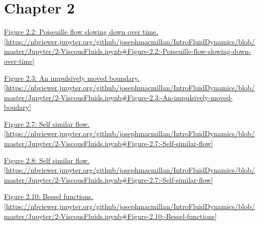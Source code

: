 \section{Chapter 2}

\noindent \href{https://nbviewer.jupyter.org/github/josephmacmillan/IntroFluidDynamics/blob/master/Jupyter/2-ViscousFluids.ipynb#Figure-2.2:-Poiseuille-flow-slowing-down-over-time}{Figure 2.2: Poiseuille flow slowing down over time. [\url{https://nbviewer.jupyter.org/github/josephmacmillan/IntroFluidDynamics/blob/master/Jupyter/2-ViscousFluids.ipynb\#Figure-2.2:-Poiseuille-flow-slowing-down-over-time}]}

\vspace{0.1in}

\noindent \href{https://nbviewer.jupyter.org/github/josephmacmillan/IntroFluidDynamics/blob/master/Jupyter/2-ViscousFluids.ipynb#Figure-2.3:-An-impulsively-moved-boudary}{Figure 2.3: An impulsively moved boundary. [\url{https://nbviewer.jupyter.org/github/josephmacmillan/IntroFluidDynamics/blob/master/Jupyter/2-ViscousFluids.ipynb\#Figure-2.3:-An-impulsively-moved-boudary}]}

\vspace{0.1in}

\noindent \href{https://nbviewer.jupyter.org/github/josephmacmillan/IntroFluidDynamics/blob/master/Jupyter/2-ViscousFluids.ipynb#Figure-2.7:-Self-similar-flow}{Figure 2.7: Self similar flow. [\url{https://nbviewer.jupyter.org/github/josephmacmillan/IntroFluidDynamics/blob/master/Jupyter/2-ViscousFluids.ipynb\#Figure-2.7:-Self-similar-flow}]}

\vspace{0.1in}

\noindent \href{https://nbviewer.jupyter.org/github/josephmacmillan/IntroFluidDynamics/blob/master/Jupyter/2-ViscousFluids.ipynb#Figure-2.7:-Self-similar-flow}{Figure 2.8: Self similar flow. [\url{https://nbviewer.jupyter.org/github/josephmacmillan/IntroFluidDynamics/blob/master/Jupyter/2-ViscousFluids.ipynb\#Figure-2.7:-Self-similar-flow}]}

\vspace{0.1in}

\noindent \href{https://nbviewer.jupyter.org/github/josephmacmillan/IntroFluidDynamics/blob/master/Jupyter/2-ViscousFluids.ipynb#Figure-2.10:-Bessel-functions}{Figure 2.10: Bessel functions. [\url{https://nbviewer.jupyter.org/github/josephmacmillan/IntroFluidDynamics/blob/master/Jupyter/2-ViscousFluids.ipynb\#Figure-2.10:-Bessel-functions}]}


